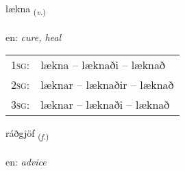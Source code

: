 \documentclass[frontgrid, backgrid]{flacards}\usepackage[]{graphicx}\usepackage[]{color}
\begin{document}
\renewcommand{\blhead}{\vskip5pt {\small\bfseries\footnotesize Sagnorð | Verb }}
\renewcommand{\bcfoot}{\vskip5pt \hspace{2pt}{\small\bfseries\footnotesize 2K}}


{lækna \small{\textsubscript{(\textit{v.})}} \\[1ex] %
\textphonetic{[laihkna]} \\
en: \emph{cure, heal} \\  [2ex]
\renewcommand*{\arraystretch}{0.8}
\begin{tabular}{p{1cm}l}
\textsc{1sg}: & lækna -- læknaði -- læknað \\ 
\textsc{2sg}: & læknar -- læknaðir -- læknað \\ 
\textsc{3sg}: & læknar -- læknaði -- læknað \\ 
\end{tabular}
}

\renewcommand{\flhead}{\vskip5pt \fboxsep=0pt {\small\bfseries\footnotesize Nafnorð | Noun}}
\renewcommand{\fcfoot}{\vskip5pt \fboxsep=0pt \hspace{2pt}{\small\bfseries\footnotesize 2K}}

\renewcommand{\blhead}{\vskip5pt {\small\bfseries\footnotesize Nafnorð | Noun }}
\renewcommand{\bcfoot}{\vskip5pt \hspace{2pt}{\small\bfseries\footnotesize 2K}}


{ráðgjöf \small{\textsubscript{(\textit{f.})}} \\[1ex] %
\textphonetic{[rauðcœv]} \\
en: \emph{advice} \\  [2ex]
\renewcommand*{\arraystretch}{0.8}
}
\end{document}
